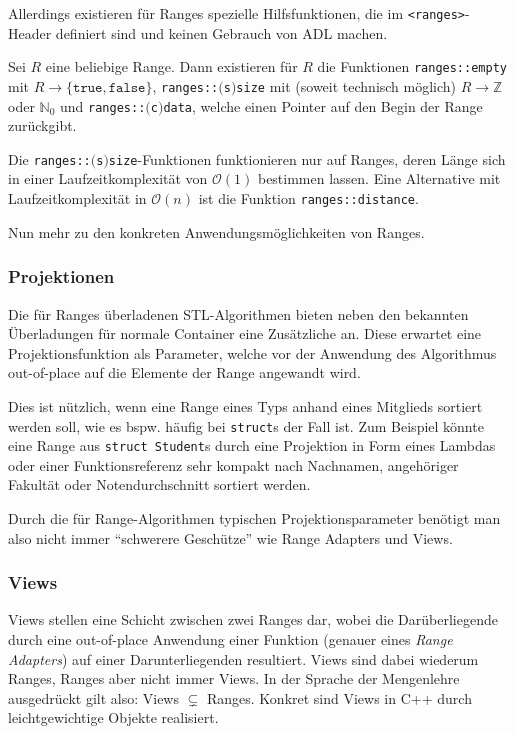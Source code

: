 \documentclass[runningheads]{llncs}
\begin{document}
Allerdings existieren für Ranges spezielle Hilfsfunktionen, die im \texttt{<ranges>}-Header definiert sind und keinen Gebrauch von ADL machen.

Sei $R$ eine beliebige Range.
Dann existieren für $R$ die Funktionen \texttt{ranges::empty} mit $R\to\{\texttt{true},\texttt{false}\}$, \texttt{ranges::$($s$)$size} mit (soweit technisch möglich) $R\to\mathbb{Z}$ oder $\mathbb{N}_0$ und \texttt{ranges::$($c$)$data}, welche einen Pointer auf den Begin der Range zurückgibt.

Die \texttt{ranges::$($s$)$size}-Funktionen funktionieren nur auf Ranges, deren Länge sich in einer Laufzeitkomplexität von $\mathcal{O}(1)$ bestimmen lassen.
Eine Alternative mit Laufzeitkomplexität in $\mathcal{O}(n)$ ist die Funktion \texttt{ranges::distance}.

Nun mehr zu den konkreten Anwendungsmöglichkeiten von Ranges.

\subsubsection{Projektionen}

Die für Ranges überladenen STL-Algorithmen bieten neben den bekannten Überladungen für normale Container eine Zusätzliche an.
Diese erwartet eine Projektionsfunktion als Parameter, welche vor der Anwendung des Algorithmus out-of-place auf die Elemente der Range angewandt wird.

Dies ist nützlich, wenn eine Range eines Typs anhand eines Mitglieds sortiert werden soll, wie es bspw. häufig bei \texttt{struct}s der Fall ist.
Zum Beispiel könnte eine Range aus \texttt{struct Student}s durch eine Projektion in Form eines Lambdas oder einer Funktionsreferenz sehr kompakt nach Nachnamen, angehöriger Fakultät oder Notendurchschnitt sortiert werden.

Durch die für Range-Algorithmen typischen Projektionsparameter benötigt man also nicht immer \enquote{schwerere Geschütze} wie Range Adapters und Views.

\subsubsection{Views}

Views stellen eine Schicht zwischen zwei Ranges dar, wobei die Darüberliegende durch eine out-of-place Anwendung einer Funktion (genauer eines \textit{Range Adapters}) auf einer Darunterliegenden resultiert.
Views sind dabei wiederum Ranges, Ranges aber nicht immer Views.
In der Sprache der Mengenlehre ausgedrückt gilt also: Views $\subsetneq$ Ranges.
Konkret sind Views in C++ durch leichtgewichtige Objekte realisiert.
\end{document}

